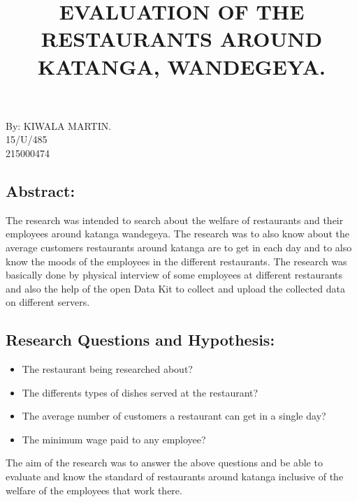 \documentclass{article}
\title{EVALUATION OF THE RESTAURANTS AROUND KATANGA, WANDEGEYA.}
\begin{document}
\begin{titlepage}
\maketitle
\begin{center}
By:
\vspace{5mm}
KIWALA MARTIN.\\
15/U/485\\
\vspace{5mm}
215000474
\end{center}
\end{titlepage}
\newpage
\begin{center}
\section{Abstract:}
\vspace{5mm}
The research was intended to search about the welfare of restaurants and their employees around katanga wandegeya.
The research was to also know about the average customers restaurants around katanga are to get in each day and to also know the moods of the employees in the different restaurants.
The research was basically done by physical interview of some employees at different restaurants and also the help of the open Data Kit to collect and upload the collected data on different servers.
\end{center}
 \begin{center}
 \section{Research Questions and Hypothesis:}
\vspace{5mm}
\begin{itemize}
\item The restaurant being researched about?
\end{itemize}
\begin{itemize}
\item The differents types of dishes served at the restaurant?
\end{itemize}
\begin{itemize}
\item The average number of customers a restaurant can get in a single day?
\end{itemize}
\begin{itemize}
\item The minimum wage paid to any employee?
\end{itemize}
The aim of the research was to answer the above questions and be able to evaluate and know the standard of restaurants around katanga inclusive of the 
welfare of the employees that work there.
\end{center}
\end{document}
